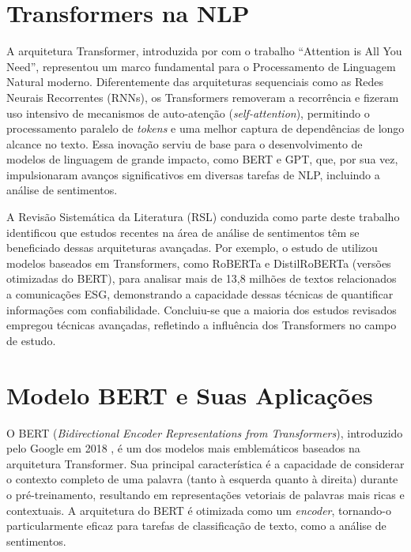 \section{Transformers na NLP}
\label{sec:transformers}

A arquitetura Transformer, introduzida por \citeauthor{vaswani2017}
\citeyear{vaswani2017} com o trabalho ``Attention is All You Need'', representou um marco
fundamental para o Processamento de Linguagem Natural moderno. Diferentemente das
arquiteturas sequenciais como as Redes Neurais Recorrentes (RNNs), os Transformers removeram
a recorrência e fizeram uso intensivo de mecanismos de auto-atenção (\textit{self-attention}),
permitindo o processamento paralelo de \textit{tokens} e uma melhor captura de dependências de
longo alcance no texto. Essa inovação serviu de base para o desenvolvimento de modelos de
linguagem de grande impacto, como \gls{BERT} e \gls{GPT}, que, por sua vez, impulsionaram
avanços significativos em diversas tarefas de NLP, incluindo a análise de sentimentos.

A Revisão Sistemática da Literatura (\gls{RSL}) conduzida como parte deste trabalho
identificou que estudos recentes na área de análise de sentimentos têm se beneficiado dessas
arquiteturas avançadas. Por exemplo, o estudo de \citeauthor{schimanski2024}
\citeyear{schimanski2024} utilizou modelos baseados em Transformers, como RoBERTa e
DistilRoBERTa (versões otimizadas do BERT), para analisar mais de 13,8 milhões de textos
relacionados a comunicações ESG, demonstrando a capacidade dessas técnicas de quantificar
informações com confiabilidade. Concluiu-se que a maioria dos estudos revisados empregou
técnicas avançadas, refletindo a influência dos Transformers no campo de estudo.

\section{Modelo BERT e Suas Aplicações}
\label{sec:bert}

O \gls{BERT} (\textit{Bidirectional Encoder Representations from Transformers}), introduzido
pelo Google em 2018 \cite{devlin2019}, é um dos modelos mais emblemáticos baseados na
arquitetura Transformer. Sua principal característica é a capacidade de considerar o contexto
completo de uma palavra (tanto à esquerda quanto à direita) durante o pré-treinamento,
resultando em representações vetoriais de palavras mais ricas e contextuais. A arquitetura do
BERT é otimizada como um \textit{encoder}, tornando-o particularmente eficaz para tarefas de
classificação de texto, como a análise de sentimentos.

